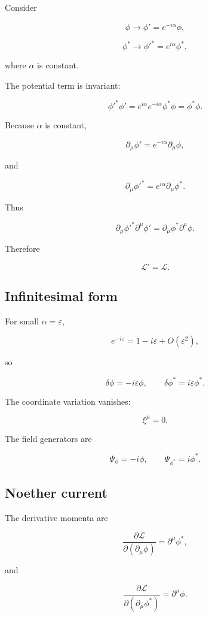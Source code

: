 Consider

\[
\boxed{
\phi
\longrightarrow
\phi'
=
e^{-i\alpha}\phi
},
\]

\[
\boxed{
\phi^{*}
\longrightarrow
\phi'^{*}
=
e^{i\alpha}\phi^{*}
},
\]

where \(\alpha\) is constant.

The potential term is invariant:

\[
\phi'^{*}\phi'
=
e^{i\alpha}
e^{-i\alpha}
\phi^{*}\phi
=
\phi^{*}\phi.
\]

Because \(\alpha\) is constant,

\[
\partial_{\mu}\phi'
=
e^{-i\alpha}\partial_{\mu}\phi,
\]

and

\[
\partial_{\mu}\phi'^{*}
=
e^{i\alpha}\partial_{\mu}\phi^{*}.
\]

Thus

\[
\partial_{\mu}\phi'^{*}
\partial^{\mu}\phi'
=
\partial_{\mu}\phi^{*}
\partial^{\mu}\phi.
\]

Therefore

\[
\boxed{
\mathcal{L}'=\mathcal{L}
}.
\]

\subsection{Infinitesimal form}

For small \(\alpha=\varepsilon\),

\[
e^{-i\varepsilon}
=
1-i\varepsilon+O(\varepsilon^{2}),
\]

so

\[
\boxed{
\delta\phi
=
-i\varepsilon\phi
},
\qquad
\boxed{
\delta\phi^{*}
=
i\varepsilon\phi^{*}
}.
\]

The coordinate variation vanishes:

\[
\xi^{\mu}=0.
\]

The field generators are

\[
\Psi_{\phi}
=
-i\phi,
\qquad
\Psi_{\phi^{*}}
=
i\phi^{*}.
\]

\subsection{Noether current}

The derivative momenta are

\[
\frac{\partial\mathcal{L}}
{\partial(\partial_{\mu}\phi)}
=
\partial^{\mu}\phi^{*},
\]

and

\[
\frac{\partial\mathcal{L}}
{\partial(\partial_{\mu}\phi^{*})}
=
\partial^{\mu}\phi.
\]

